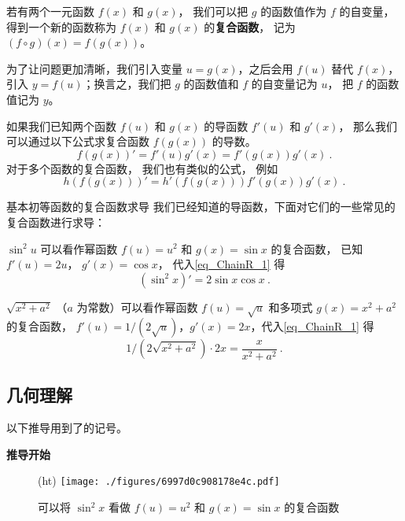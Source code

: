 

若有两个一元函数 $f(x)$ 和 $g(x)$， 我们可以把 $g$ 的函数值作为 $f$ 的自变量， 得到一个新的函数称为 $f(x)$ 和 $g(x)$ 的\textbf{复合函数}， 记为 $(f \circ g)(x) = f(g(x))$。

为了让问题更加清晰，我们引入变量 $u = g(x)$，之后会用 $f(u)$ 替代 $f(x)$，引入 $y = f(u)$；换言之，我们把 $g$ 的函数值和 $f$ 的自变量记为 $u$， 把 $f$ 的函数值记为 $y$。

如果我们已知两个函数 $f(u)$ 和 $g(x)$ 的导函数 $f'(u)$ 和 $g'(x)$， 那么我们可以通过以下公式求复合函数 $f(g(x))$ 的导数。
\begin{equation}\label{eq_ChainR_1}
f(g(x))' = f'(u) g'(x) = f'(g(x))g'(x)~.
\end{equation}
对于多个函数的复合函数， 我们也有类似的公式， 例如
\begin{equation}\label{eq_ChainR_5}
h(f(g(x)))' = h'(f(g(x)))f'(g(x))g'(x)~.
\end{equation}

\begin{example}{基本初等函数的复合函数求导}
我们已经知道的导函数，下面对它们的一些常见的复合函数进行求导：

$\sin^2 u$ 可以看作幂函数 $f(u) = u^2$ 和 $g(x) = \sin x$ 的复合函数， 已知 $f'(u) = 2u$， $g'(x) = \cos x$， 代入\autoref{eq_ChainR_1} 得
\begin{equation}
(\sin^2 x)' = 2\sin x \cos x~.
\end{equation}

$\sqrt{x^2 + a^2}$ （$a$ 为常数）可以看作幂函数 $f(u) = \sqrt{u}$ 和多项式 $g(x) = x^2 + a^2$ 的复合函数， $f'(u) = 1/(2\sqrt u)$，$g'(x) = 2 x$，代入\autoref{eq_ChainR_1} 得
\begin{equation}
1/(2\sqrt{x^2 + a^2}) \cdot 2 x = \frac{x}{x^2 + a^2}~.
\end{equation}
\end{example}

\subsection{几何理解}
以下推导用到了的记号。

\textbf{推导开始}

\begin{figure}(ht)
\centering
\texttt{[image: ./figures/6997d0c908178e4c.pdf]}
\caption{可以将 $\sin^2 x$ 看做 $f(u) = u^2$ 和 $g(x) = \sin x$ 的复合函数}\label{fig_ChainR_1}
\end{figure}

